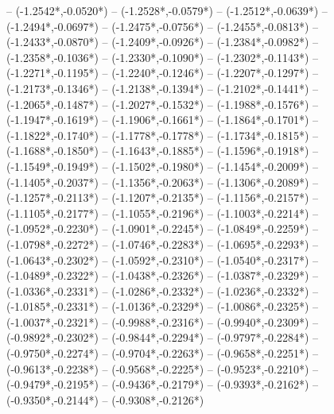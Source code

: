 {	-- ({-1.2542*\dx},{-0.0520*\dy})
	-- ({-1.2528*\dx},{-0.0579*\dy})
	-- ({-1.2512*\dx},{-0.0639*\dy})
	-- ({-1.2494*\dx},{-0.0697*\dy})
	-- ({-1.2475*\dx},{-0.0756*\dy})
	-- ({-1.2455*\dx},{-0.0813*\dy})
	-- ({-1.2433*\dx},{-0.0870*\dy})
	-- ({-1.2409*\dx},{-0.0926*\dy})
	-- ({-1.2384*\dx},{-0.0982*\dy})
	-- ({-1.2358*\dx},{-0.1036*\dy})
	-- ({-1.2330*\dx},{-0.1090*\dy})
	-- ({-1.2302*\dx},{-0.1143*\dy})
	-- ({-1.2271*\dx},{-0.1195*\dy})
	-- ({-1.2240*\dx},{-0.1246*\dy})
	-- ({-1.2207*\dx},{-0.1297*\dy})
	-- ({-1.2173*\dx},{-0.1346*\dy})
	-- ({-1.2138*\dx},{-0.1394*\dy})
	-- ({-1.2102*\dx},{-0.1441*\dy})
	-- ({-1.2065*\dx},{-0.1487*\dy})
	-- ({-1.2027*\dx},{-0.1532*\dy})
	-- ({-1.1988*\dx},{-0.1576*\dy})
	-- ({-1.1947*\dx},{-0.1619*\dy})
	-- ({-1.1906*\dx},{-0.1661*\dy})
	-- ({-1.1864*\dx},{-0.1701*\dy})
	-- ({-1.1822*\dx},{-0.1740*\dy})
	-- ({-1.1778*\dx},{-0.1778*\dy})
	-- ({-1.1734*\dx},{-0.1815*\dy})
	-- ({-1.1688*\dx},{-0.1850*\dy})
	-- ({-1.1643*\dx},{-0.1885*\dy})
	-- ({-1.1596*\dx},{-0.1918*\dy})
	-- ({-1.1549*\dx},{-0.1949*\dy})
	-- ({-1.1502*\dx},{-0.1980*\dy})
	-- ({-1.1454*\dx},{-0.2009*\dy})
	-- ({-1.1405*\dx},{-0.2037*\dy})
	-- ({-1.1356*\dx},{-0.2063*\dy})
	-- ({-1.1306*\dx},{-0.2089*\dy})
	-- ({-1.1257*\dx},{-0.2113*\dy})
	-- ({-1.1207*\dx},{-0.2135*\dy})
	-- ({-1.1156*\dx},{-0.2157*\dy})
	-- ({-1.1105*\dx},{-0.2177*\dy})
	-- ({-1.1055*\dx},{-0.2196*\dy})
	-- ({-1.1003*\dx},{-0.2214*\dy})
	-- ({-1.0952*\dx},{-0.2230*\dy})
	-- ({-1.0901*\dx},{-0.2245*\dy})
	-- ({-1.0849*\dx},{-0.2259*\dy})
	-- ({-1.0798*\dx},{-0.2272*\dy})
	-- ({-1.0746*\dx},{-0.2283*\dy})
	-- ({-1.0695*\dx},{-0.2293*\dy})
	-- ({-1.0643*\dx},{-0.2302*\dy})
	-- ({-1.0592*\dx},{-0.2310*\dy})
	-- ({-1.0540*\dx},{-0.2317*\dy})
	-- ({-1.0489*\dx},{-0.2322*\dy})
	-- ({-1.0438*\dx},{-0.2326*\dy})
	-- ({-1.0387*\dx},{-0.2329*\dy})
	-- ({-1.0336*\dx},{-0.2331*\dy})
	-- ({-1.0286*\dx},{-0.2332*\dy})
	-- ({-1.0236*\dx},{-0.2332*\dy})
	-- ({-1.0185*\dx},{-0.2331*\dy})
	-- ({-1.0136*\dx},{-0.2329*\dy})
	-- ({-1.0086*\dx},{-0.2325*\dy})
	-- ({-1.0037*\dx},{-0.2321*\dy})
	-- ({-0.9988*\dx},{-0.2316*\dy})
	-- ({-0.9940*\dx},{-0.2309*\dy})
	-- ({-0.9892*\dx},{-0.2302*\dy})
	-- ({-0.9844*\dx},{-0.2294*\dy})
	-- ({-0.9797*\dx},{-0.2284*\dy})
	-- ({-0.9750*\dx},{-0.2274*\dy})
	-- ({-0.9704*\dx},{-0.2263*\dy})
	-- ({-0.9658*\dx},{-0.2251*\dy})
	-- ({-0.9613*\dx},{-0.2238*\dy})
	-- ({-0.9568*\dx},{-0.2225*\dy})
	-- ({-0.9523*\dx},{-0.2210*\dy})
	-- ({-0.9479*\dx},{-0.2195*\dy})
	-- ({-0.9436*\dx},{-0.2179*\dy})
	-- ({-0.9393*\dx},{-0.2162*\dy})
	-- ({-0.9350*\dx},{-0.2144*\dy})
	-- ({-0.9308*\dx},{-0.2126*\dy})
}
